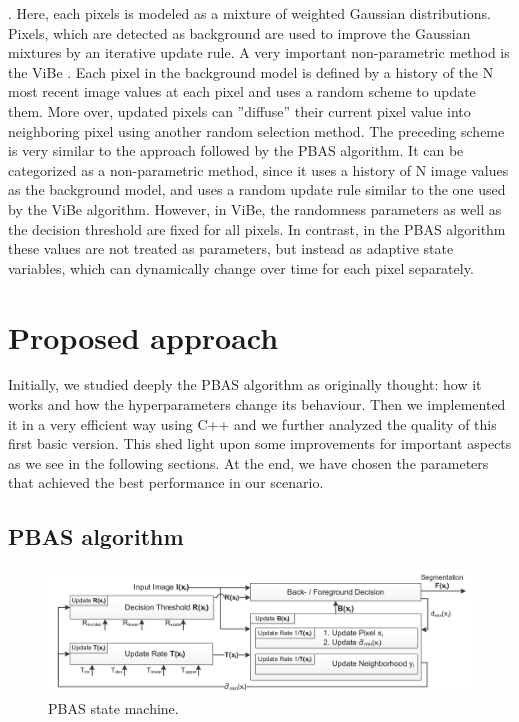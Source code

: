 \cite{gmm}. Here, each pixels is modeled as a mixture of weighted Gaussian distributions. Pixels, which
are detected as background are used to improve the Gaussian mixtures by an iterative update rule. A very
important non-parametric method is the ViBe \cite{vibe}. Each pixel in the background model is defined by
a history of the N most recent image values at each pixel and uses a random scheme to update them.
More over, updated pixels can ”diffuse” their current pixel value into neighboring pixel using another
random selection method. The preceding scheme is very similar to the approach followed by the PBAS algorithm.
It can be categorized as a non-parametric method, since it uses a history of N image values as the background
model, and uses a random update rule similar to the one used by the ViBe algorithm. However, in ViBe, the
randomness parameters as well as the decision threshold are fixed for all pixels. In contrast, in the PBAS
algorithm these values are not treated as parameters, but instead as adaptive state variables, which can
dynamically change over time for each pixel separately.


\section*{Proposed approach}
Initially, we studied deeply the PBAS algorithm as originally thought: how it works and how the hyperparameters change its behaviour. Then we implemented it in a very efficient way using C++ and we further analyzed the quality of this first basic version. This shed light upon some improvements for important aspects as we see in the following sections.
At the end, we have chosen the parameters that achieved the best performance in our scenario.
\subsection{PBAS algorithm} \label{subsect:PBAS}

\begin{figure}
  \includegraphics[width=\textwidth]{Figures/PBAS_state_machine.png}
  \caption{PBAS state machine.}
\end{figure}

